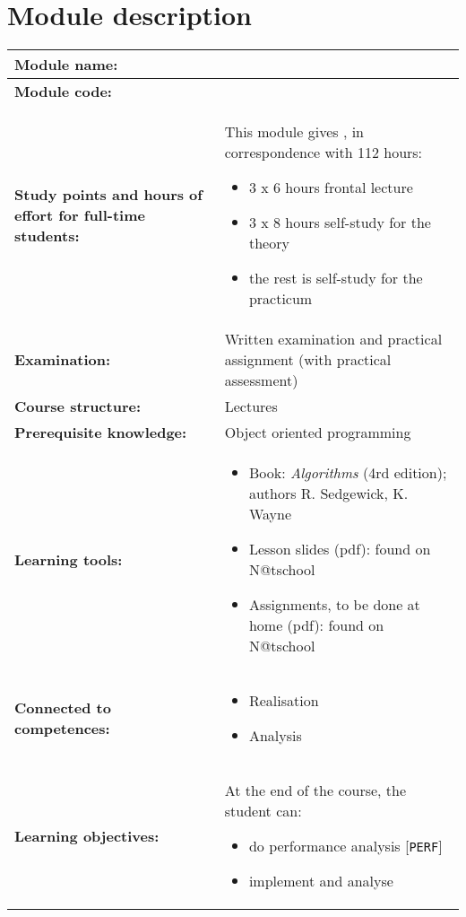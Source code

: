 \section*{Module description}
\begin{tabularx}{\textwidth}{|>{\columncolor{lichtGrijs}} p{}|X|}
	\hline
	\textbf{Module name:} & \modulenaam\\
	\hline
	\textbf{Module code: }& \modulecode\\
	\hline
	\textbf{Study points \newline and hours of effort for full-time students:} & This module gives \stdPunten, in correspondence with 112 hours:
	\begin{itemize}
		\item 3 x 6 hours frontal lecture
		\item 3 x 8 hours self-study for the theory
		\item the rest is self-study for the practicum
	\end{itemize} \\
	\hline
	\textbf{Examination:} & Written examination and practical assignment (with practical assessment) \\
	\hline
	\textbf{Course structure:} & Lectures \\
	\hline
	\textbf{Prerequisite knowledge:} & Object oriented programming \\
	\hline
	\textbf{Learning tools:} & \begin{itemize}
			\item Book: \textit{Algorithms} (4rd edition); authors R. Sedgewick, K. Wayne
			\item Lesson slides (pdf): found on N@tschool
			\item Assignments, to be done at home (pdf): found on N@tschool
		\end{itemize} \\
	\hline
	\textbf{Connected to \newline competences:} & \begin{itemize}
			\item Realisation
			\item Analysis
		\end{itemize} \\
	\hline
	\textbf{Learning objectives:} &
		At the end of the course, the student can:
			\begin{itemize}
				\item do performance analysis [\texttt{PERF}]
				\item implement and analyse 

\end{itemize}
\end{tabularx}
